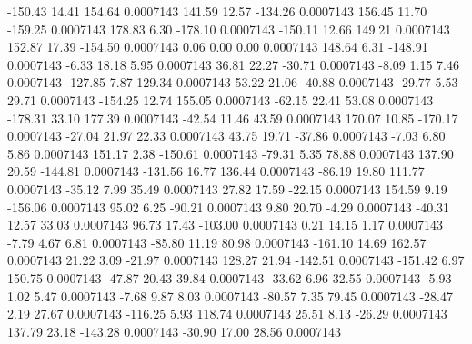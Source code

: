      -150.43       14.41      154.64     0.0007143
      141.59       12.57     -134.26     0.0007143
      156.45       11.70     -159.25     0.0007143
      178.83        6.30     -178.10     0.0007143
     -150.11       12.66      149.21     0.0007143
      152.87       17.39     -154.50     0.0007143
        0.06        0.00        0.00     0.0007143
      148.64        6.31     -148.91     0.0007143
       -6.33       18.18        5.95     0.0007143
       36.81       22.27      -30.71     0.0007143
       -8.09        1.15        7.46     0.0007143
     -127.85        7.87      129.34     0.0007143
       53.22       21.06      -40.88     0.0007143
      -29.77        5.53       29.71     0.0007143
     -154.25       12.74      155.05     0.0007143
      -62.15       22.41       53.08     0.0007143
     -178.31       33.10      177.39     0.0007143
      -42.54       11.46       43.59     0.0007143
      170.07       10.85     -170.17     0.0007143
      -27.04       21.97       22.33     0.0007143
       43.75       19.71      -37.86     0.0007143
       -7.03        6.80        5.86     0.0007143
      151.17        2.38     -150.61     0.0007143
      -79.31        5.35       78.88     0.0007143
      137.90       20.59     -144.81     0.0007143
     -131.56       16.77      136.44     0.0007143
      -86.19       19.80      111.77     0.0007143
      -35.12        7.99       35.49     0.0007143
       27.82       17.59      -22.15     0.0007143
      154.59        9.19     -156.06     0.0007143
       95.02        6.25      -90.21     0.0007143
        9.80       20.70       -4.29     0.0007143
      -40.31       12.57       33.03     0.0007143
       96.73       17.43     -103.00     0.0007143
        0.21       14.15        1.17     0.0007143
       -7.79        4.67        6.81     0.0007143
      -85.80       11.19       80.98     0.0007143
     -161.10       14.69      162.57     0.0007143
       21.22        3.09      -21.97     0.0007143
      128.27       21.94     -142.51     0.0007143
     -151.42        6.97      150.75     0.0007143
      -47.87       20.43       39.84     0.0007143
      -33.62        6.96       32.55     0.0007143
       -5.93        1.02        5.47     0.0007143
       -7.68        9.87        8.03     0.0007143
      -80.57        7.35       79.45     0.0007143
      -28.47        2.19       27.67     0.0007143
     -116.25        5.93      118.74     0.0007143
       25.51        8.13      -26.29     0.0007143
      137.79       23.18     -143.28     0.0007143
      -30.90       17.00       28.56     0.0007143
